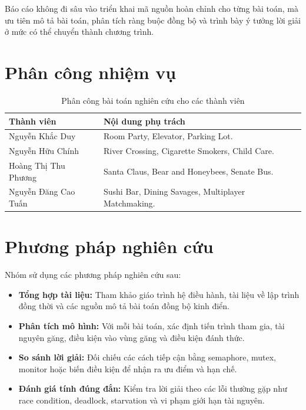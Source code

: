 Báo cáo không đi sâu vào triển khai mã nguồn hoàn chỉnh cho từng bài toán, mà ưu tiên mô tả bài toán, phân tích ràng buộc đồng bộ và trình bày ý tưởng lời giải ở mức có thể chuyển thành chương trình.

\section{Phân công nhiệm vụ}

\begin{table}[H]
    \centering
    \renewcommand{\arraystretch}{1.3}
    \begin{tabular}{|p{3cm}|p{11cm}|}
        \hline
        \textbf{Thành viên} & \textbf{Nội dung phụ trách} \\ \hline
        Nguyễn Khắc Duy & Room Party, Elevator, Parking Lot. \\ \hline
        Nguyễn Hữu Chính & River Crossing, Cigarette Smokers, Child Care. \\ \hline
        Hoàng Thị Thu Phương & Santa Claus, Bear and Honeybees, Senate Bus. \\ \hline
        Nguyễn Đăng Cao Tuấn & Sushi Bar, Dining Savages, Multiplayer Matchmaking. \\ \hline
    \end{tabular}
    \caption{Phân công bài toán nghiên cứu cho các thành viên}
\end{table}

\section{Phương pháp nghiên cứu}

Nhóm sử dụng các phương pháp nghiên cứu sau:

\begin{itemize}
    \item \textbf{Tổng hợp tài liệu:} Tham khảo giáo trình hệ điều hành, tài liệu về lập trình đồng thời và các nguồn mô tả bài toán đồng bộ kinh điển.
    \item \textbf{Phân tích mô hình:} Với mỗi bài toán, xác định tiến trình tham gia, tài nguyên găng, điều kiện vào vùng găng và điều kiện đánh thức.
    \item \textbf{So sánh lời giải:} Đối chiếu các cách tiếp cận bằng semaphore, mutex, monitor hoặc biến điều kiện để nhận ra ưu điểm và hạn chế.
    \item \textbf{Đánh giá tính đúng đắn:} Kiểm tra lời giải theo các lỗi thường gặp như race condition, deadlock, starvation và vi phạm giới hạn tài nguyên.
\end{itemize}

